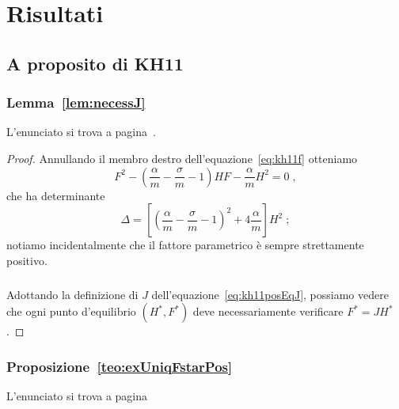 \chapter{Risultati}

\section{A proposito di KH11}
\subsection{ Lemma~\ref{lem:necessJ} }
L'enunciato si trova a pagina~\pageref{lem:necessJ}.
\begin{proof}
    Annullando il membro destro dell'equazione~\eqref{eq:kh11f} otteniamo
    $$F^2 - \left( \frac{\alpha}{m} - \frac{\sigma}{m} -1
        \right) H F - \frac{\alpha}{m} H^2 = 0 \; ,$$
    che ha determinante
    $$\Delta = \left[ {\left( \frac{\alpha}{m} - \frac{\sigma}{m} -1
        \right)}^2 + 4 \frac{\alpha}{m}
        \right] H^2 \; ; $$
    notiamo incidentalmente che il fattore parametrico è sempre strettamente positivo.

    \paragraph{}
    Adottando la definizione di $J$ dell'equazione~\eqref{eq:kh11posEqJ}, possiamo vedere
    che ogni punto d'equilibrio $(H^*, F^*)$ deve necessariamente verificare $F^* = J H^*$.
\end{proof}


\subsection{ Proposizione~\ref{teo:exUniqFstarPos} }
L'enunciato si trova a pagina~\pageref{teo:exUniqFstarPos}

